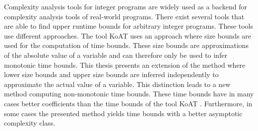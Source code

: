 Complexity analysis tools for integer programs are widely used as a backend for complexity analysis tools of real-world programs.
There exist several tools that are able to find upper runtime bounds for arbitrary integer programs.
These tools use different approaches.
The tool KoAT \cite{koat} uses an approach where size bounds are used for the computation of time bounds.
These size bounds are approximations of the absolute value of a variable and can therefore only be used to infer monotonic time bounds.
This thesis presents an extension of the method where lower size bounds and upper size bounds are inferred independently to approximate the actual value of a variable.
This distinction leads to a new method computing non-monotonic time bounds.
These time bounds have in many cases better coefficients than the time bounds of the tool KoAT \cite{koat}.
Furthermore, in some cases the presented method yields time bounds with a better asymptotic complexity class. 

